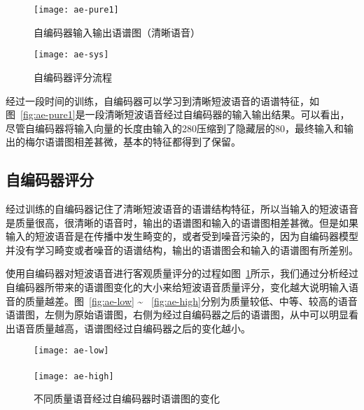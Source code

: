 \begin{figure}
\begin{minipage}{0.55\textwidth}
  \centering
  \texttt{[image: ae-pure1]}
  \caption{自编码器输入输出语谱图（清晰语音）\label{fig:ae-pure1}}
\end{minipage}
\begin{minipage}{0.35\textwidth}
  \centering
  \texttt{[image: ae-sys]}
  \caption{自编码器评分流程 \label{fig:ae-sys}}
\end{minipage}
\end{figure}

经过一段时间的训练，自编码器可以学习到清晰短波语音的语谱特征，如图~\ref{fig:ae-pure1}是一段清晰短波语音经过自编码器的输入输出结果。可以看出，尽管自编码器将输入向量的长度由输入的280压缩到了隐藏层的80，最终输入和输出的梅尔语谱图相差甚微，基本的特征都得到了保留。

\subsection{自编码器评分}

经过训练的自编码器记住了清晰短波语音的语谱结构特征，所以当输入的短波语音是质量很高，很清晰的语音时，输出的语谱图和输入的语谱图相差甚微。但是如果输入的短波语音是在传播中发生畸变的，或者受到噪音污染的，因为自编码器模型并没有学习畸变或者噪音的语谱结构，输出的语谱图会和输入的语谱图有所差别。

使用自编码器对短波语音进行客观质量评分的过程如图~\ref{fig:ae-sys}所示，我们通过分析经过自编码器所带来的语谱图变化的大小来给短波语音质量评分，变化越大说明输入语音的质量越差。图~\ref{fig:ae-low} \~ ~\ref{fig:ae-high}分别为质量较低、中等、较高的语音语谱图，左侧为原始语谱图，右侧为经过自编码器之后的语谱图，从中可以明显看出语音质量越高，语谱图经过自编码器之后的变化越小。

\begin{figure}
\centering
{} {
    \texttt{[image: ae-low]}
}
\vspace{0.8ex}
\\
\vspace{0.8ex}
\\
 {
    \texttt{[image: ae-high]}
}
\vspace{0.8ex}
\\
\caption{不同质量语音经过自编码器时语谱图的变化\label{fig:ae-diffs}}
\end{figure}

